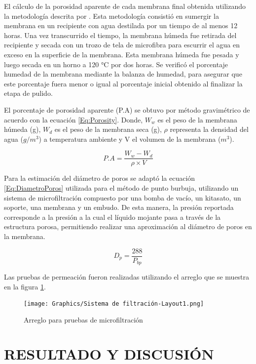 \documentclass{article}
\begin{document}
El cálculo de la porosidad aparente de cada membrana final obtenida 
utilizando la metodología descrita por \parencite[p~122]{Purkait2018}. Esta metodología consistió en sumergir la membrana en un recipiente con agua destilada por un tiempo de al menos 12 horas. Una vez transcurrido el tiempo, la membrana húmeda fue retirada del recipiente y secada con un trozo de tela de microfibra para escurrir el agua en exceso en la superficie de la membrana. Esta membrana húmeda fue pesada y luego secada en un horno a 120 °C por dos horas. Se verificó el porcentaje humedad de la membrana mediante la balanza de humedad, para asegurar que este porcentaje fuera menor o igual al porcentaje inicial obtenido al finalizar la etapa de pulido. 

El porcentaje de porosidad aparente (P.A) se obtuvo por método 
gravimétrico de acuerdo con la ecuación \ref{Eq:Porosity}. 
Donde, $W_w$ es el peso de la membrana húmeda (g), $W_d$ es el peso 
de la membrana seca (g), $\rho$ representa la densidad del agua ($g/m^3$) 
a temperatura ambiente y V el volumen de la membrana ($m^3$).

\begin{equation}
    P.A = \frac{W_w-W_d}{\rho \times V}
    \label{Eq:Porosity}
\end{equation}

Para la estimación del diámetro de poros se adaptó la 
ecuación \ref{Eq:DiametroPoros} utilizada para el método de punto 
burbuja, utilizando un sistema de microfiltración compuesto por una 
bomba de vacío, un kitasato, un soporte, una membrana y un embudo. 
De esta manera, la presión reportada corresponde a la presión a la 
cual el líquido mojante pasa a través de la estructura porosa, 
permitiendo realizar una aproximación al diámetro de poros en la 
membrana. 

\begin{equation}
    D_p = \frac{288}{P_{bp}}
    \label{Eq:DiametroPoros}
\end{equation}

Las pruebas de permeación fueron realizadas utilizando el arreglo 
que se muestra en la figura \ref{fig:Arreglo_MF}. 

\begin{figure}
    \centering
    \texttt{[image: Graphics/Sistema de filtración-Layout1.png]}
    \caption{Arreglo para pruebas de microfiltración}
    \label{fig:Arreglo_MF}
\end{figure}

\section{RESULTADO Y DISCUSIÓN}
\end{document}
